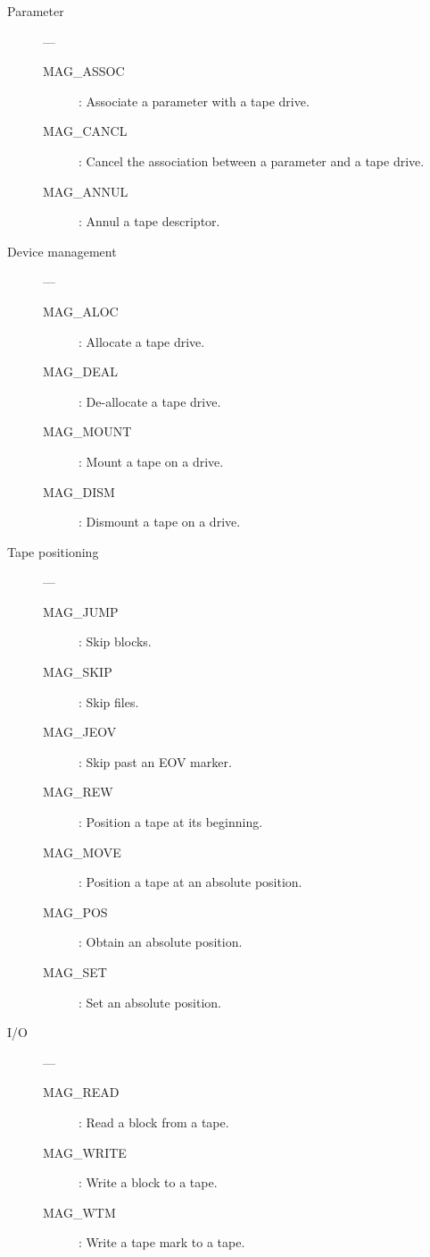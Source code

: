 \begin{description}

\item [Parameter] ---

\begin{description}
\item [MAG\_ASSOC] : Associate a parameter with a tape drive.
\item [MAG\_CANCL] : Cancel the association between a parameter and a tape
 drive.
\item [MAG\_ANNUL] : Annul a tape descriptor.
\end{description}

\item [Device management] ---

\begin{description}
\item [MAG\_ALOC] : Allocate a tape drive.
\item [MAG\_DEAL] : De-allocate a tape drive.
\item [MAG\_MOUNT] : Mount a tape on a drive.
\item [MAG\_DISM] : Dismount a tape on a drive.
\end{description}

\item [Tape positioning] ---

\begin{description}
\item [MAG\_JUMP] : Skip blocks.
\item [MAG\_SKIP] : Skip files.
\item [MAG\_JEOV] : Skip past an EOV marker.
\item [MAG\_REW] : Position a tape at its beginning.
\item [MAG\_MOVE] : Position a tape at an absolute position.
\item [MAG\_POS] : Obtain an absolute position.
\item [MAG\_SET] : Set an absolute position.
\end{description}

\item [I/O] ---

\begin{description}
\item [MAG\_READ] : Read a block from a tape.
\item [MAG\_WRITE] : Write a block to a tape.
\item [MAG\_WTM] : Write a tape mark to a tape.
\end{description}

\end{description}

